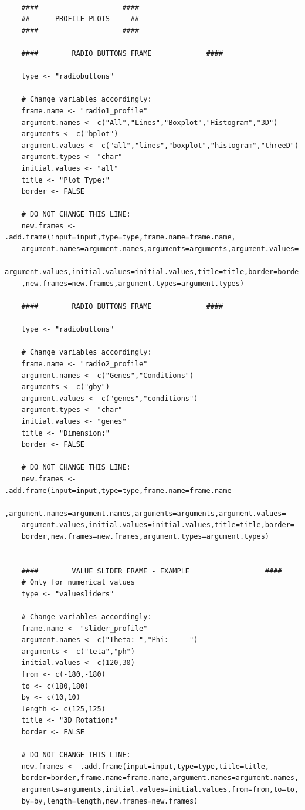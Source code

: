 \documentclass[a4paper]{article}\usepackage[]{graphicx}\usepackage[]{color}
\begin{document}
\begin{verbatim}
	
	####                    ####
	##	    PROFILE PLOTS     ##
	####                    ####
	
	####		RADIO BUTTONS FRAME  			####
	
	type <- "radiobuttons"
	
	# Change variables accordingly:
	frame.name <- "radio1_profile"
	argument.names <- c("All","Lines","Boxplot","Histogram","3D")  
	arguments <- c("bplot")		
	argument.values <- c("all","lines","boxplot","histogram","threeD") 
	argument.types <- "char"
	initial.values <- "all" 
	title <- "Plot Type:"
	border <- FALSE
	
	# DO NOT CHANGE THIS LINE:
	new.frames <- .add.frame(input=input,type=type,frame.name=frame.name,
    argument.names=argument.names,arguments=arguments,argument.values=
    argument.values,initial.values=initial.values,title=title,border=border
    ,new.frames=new.frames,argument.types=argument.types)	
	
	####		RADIO BUTTONS FRAME  			####
	
	type <- "radiobuttons"
	
	# Change variables accordingly:
	frame.name <- "radio2_profile"
	argument.names <- c("Genes","Conditions")  
	arguments <- c("gby")		
	argument.values <- c("genes","conditions") 
	argument.types <- "char"
	initial.values <- "genes" 
	title <- "Dimension:"
	border <- FALSE
	
	# DO NOT CHANGE THIS LINE:
	new.frames <- .add.frame(input=input,type=type,frame.name=frame.name
    ,argument.names=argument.names,arguments=arguments,argument.values=
    argument.values,initial.values=initial.values,title=title,border=
    border,new.frames=new.frames,argument.types=argument.types)	
	
	
	####		VALUE SLIDER FRAME - EXAMPLE 				  ####
	# Only for numerical values
	type <- "valuesliders"
	
	# Change variables accordingly:
	frame.name <- "slider_profile"
	argument.names <- c("Theta: ","Phi:     ") 
	arguments <- c("teta","ph")
	initial.values <- c(120,30)
	from <- c(-180,-180) 
	to <- c(180,180) 
	by <- c(10,10)  
	length <- c(125,125) 
	title <- "3D Rotation:"
	border <- FALSE
	
	# DO NOT CHANGE THIS LINE:
	new.frames <- .add.frame(input=input,type=type,title=title,
    border=border,frame.name=frame.name,argument.names=argument.names,
    arguments=arguments,initial.values=initial.values,from=from,to=to,
    by=by,length=length,new.frames=new.frames)
	
	
	

\end{verbatim}
\end{document}
